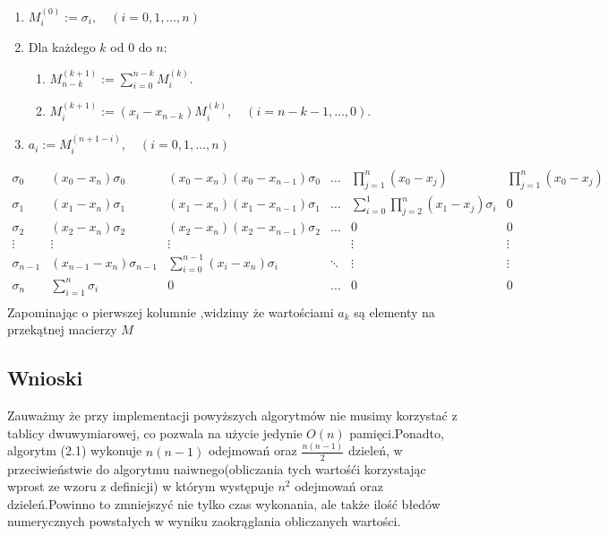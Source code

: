 \documentclass[11pt,wide]{article}
\begin{document}
\begin{enumerate}
\item $M_i^{(0)} := \sigma_i, \quad (i = 0,1,\ldots,n)$
\item Dla każdego $k$ od $0$ do $n$:
\begin{enumerate}
	\item $M_{n-k}^{(k+1)} := \displaystyle\sum_{i=0}^{n-k} M_i^{(k)}$.
	\item $M_i^{(k+1)} := (x_i - x_{n-k})M_i^{(k)}, \quad (i = n-k-1,\ldots,0)$.
\end{enumerate}	
\item $a_i := M_i^{(n+1-i)}, \quad (i = 0,1,\ldots,n)$
\end{enumerate}
\[
 \begin{matrix}
  \sigma_0     & (x_0 - x_n)\sigma_0 & (x_0 - x_n)(x_0 - x_{n-1})\sigma_0 & \ldots & \displaystyle\prod_{j = 1}^n (x_0 - x_j) & \displaystyle\prod_{j = 1}^n (x_0 - x_j)  \\
  \sigma_1     & (x_1 - x_n)\sigma_1 & (x_1 - x_n)(x_1 - x_{n-1})\sigma_1 & \ldots & \displaystyle\sum_{i=0}^1 \displaystyle\prod_{j = 2}^n (x_1 - x_j)\sigma_i & 0 \\
  \sigma_2     & (x_2 - x_n)\sigma_2 & (x_2 - x_n)(x_2 - x_{n-1})\sigma_2 & \ldots & 0 & 0  \\
  \vdots       & \vdots              & \vdots & & \vdots & \vdots\\
  \sigma_{n-1} & (x_{n-1} - x_n)\sigma_{n-1}        & \displaystyle\sum_{i=0}^{n-1} (x_i - x_n)\sigma_i & \ddots & \vdots & \vdots\\
  \sigma_n     & \displaystyle\sum_{i=1}^n \sigma_i & 0 & \ldots & 0 & 0 \\
 \end{matrix}
\]
Zapominając o pierwszej kolumnie ,widzimy że wartościami $a_k$ są elementy na przekątnej macierzy $M$
\subsection{Wnioski}
Zauważmy że przy implementacji powyższych algorytmów nie musimy korzystać z tablicy dwuwymiarowej, co pozwala na użycie jedynie $O(n)$ pamięci.Ponadto, algorytm (2.1) wykonuje $n(n-1)$ odejmowań oraz $\frac{n(n-1)}{2}$ dzieleń, w przeciwieństwie do algorytmu naiwnego(obliczania tych wartośći korzystając wprost ze wzoru z definicji) w którym występuje $n^2$ odejmowań oraz dzieleń.Powinno to zmniejszyć nie tylko czas wykonania, ale także ilość błedów numerycznych powstałych w wyniku zaokrąglania obliczanych wartości.
\end{document}
